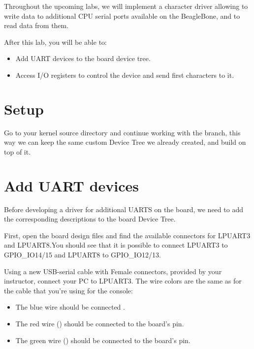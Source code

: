 
Throughout the upcoming labs, we will implement a character driver
allowing to write data to additional CPU serial ports available on
the BeagleBone, and to read data from them.

After this lab, you will be able to:

\begin{itemize}
\item Add UART devices to the board device tree.
\item Access I/O registers to control the device and
      send first characters to it.
\end{itemize}

\section{Setup}

Go to your kernel source directory and continue working with the
 branch, this way we can keep the same custom Device
Tree we already created, and build on top of it.

\section{Add UART devices}

Before developing a driver for additional UARTS on the board, we
need to add the corresponding descriptions to the board Device Tree.

First, open the board design files and find the available connectors
for LPUART3 and LPUART8.You should see that it is possible to connect LPUART3 to GPIO\_IO14/15 and LPUART8 to GPIO\_IO12/13.

Using a new USB-serial cable with Female connectors, provided by your
instructor, connect your PC to LPUART3. The wire colors are the same
as for the cable that you're using for the console:

\begin{itemize}
\item The blue wire should be connected .
\item The red wire () should be connected to the board's  pin.
\item The green wire () should be connected to the board's  pin.
\end{itemize}

